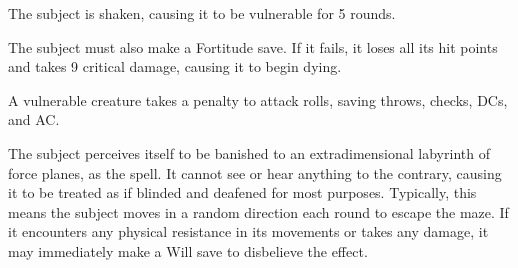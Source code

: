 \spellrng{\rngmed}
\begin{spelleffect}
  The subject is shaken, causing it to be vulnerable for 5 rounds.
\end{spelleffect}
\begin{spellblood}
  The subject must also make a Fortitude save. If it fails, it loses all its hit points and takes 9 critical damage, causing it to begin dying.
\end{spellblood}
\begin{spellnotes}
  A vulnerable creature takes a  penalty to attack rolls, saving throws, checks, DCs, and AC.
\end{spellnotes}

\spellrng{\rngclose}
\spelldur{\durmed}
\begin{spelleffect}
  The subject perceives itself to be banished to an extradimensional labyrinth of force planes, as the  spell. It cannot see or hear anything to the contrary, causing it to be treated as if blinded and deafened for most purposes. Typically, this means the subject moves in a random direction each round to escape the maze. If it encounters any physical resistance in its movements or takes any damage, it may immediately make a Will save to disbelieve the effect.
\end{spelleffect}

